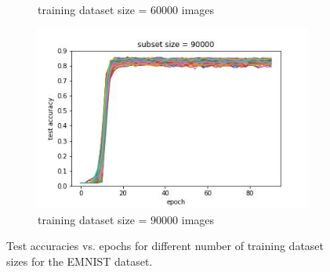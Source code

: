 \documentclass{article} %
\begin{document}
\begin{figure}
\begin{subfigure}{.5\textwidth}
        \caption{training dataset size = $60000$ images}
        \label{fig:subsetsize30000}
    \end{subfigure}%
    \begin{subfigure}{.5\textwidth}
        \centering
        \includegraphics[width=.8\linewidth]{emnist/test_acc_vs_epoch_subset_size_90000.jpg}
        \caption{training dataset size = $90000$ images}
        \label{fig:subsetsize45000}
    \end{subfigure}

    \caption{Test accuracies vs. epochs for different number of training dataset sizes for the EMNIST dataset.}
    \label{fig:emnist_accuracy_vs_epoch_by_subset_size}
\end{figure}
\end{document}
